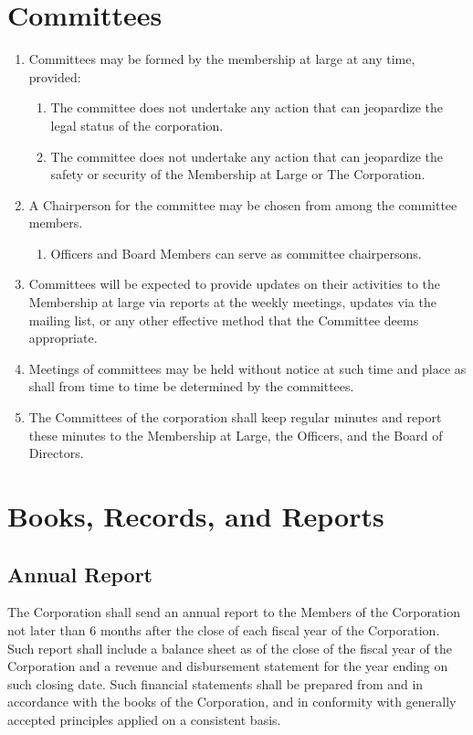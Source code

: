 \documentclass{article}
\begin{document}
\section{Committees}
  \begin{enumerate}
    \item Committees may be formed by the membership at large at any time, provided:
    \begin{enumerate}
      \item The committee does not undertake any action that can jeopardize the legal status
      of the corporation.
      \item The committee does not undertake any action that can jeopardize the safety or
      security of the Membership at Large or The Corporation.
    \end{enumerate}
    \item A Chairperson for the committee may be chosen from among the committee
    members.
    \begin{enumerate}
      \item Officers and Board Members can serve as committee chairpersons.
    \end{enumerate}
    \item Committees will be expected to provide updates on their activities to the
    Membership at large via reports at the weekly meetings, updates via the mailing list, or any
    other effective method that the Committee deems appropriate.
    \item Meetings of committees may be held without notice at such time and place as shall
    from time to time be determined by the committees.
    \item The Committees of the corporation shall keep regular minutes and report these
    minutes to the Membership at Large, the Officers, and the Board of Directors.
  \end{enumerate}
\section{Books, Records, and Reports}
  \subsection{Annual Report}
  The Corporation shall send an annual report to the Members of the Corporation not later
  than 6 months after the close of each fiscal year of the Corporation. Such report shall
  include a balance sheet as of the close of the fiscal year of the Corporation and a revenue
  and disbursement statement for the year ending on such closing date.  Such financial
  statements shall be prepared from and in accordance with the books of the Corporation,
  and in conformity with generally accepted principles applied on a consistent basis.
\end{document}
